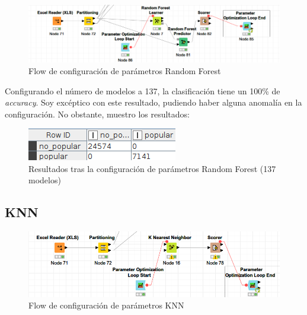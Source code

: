 \begin{figure}[H] %
	\centering
	\includegraphics[scale=0.38]{flow-param-rf.png}  %
	\caption{Flow de configuración de parámetros Random Forest} 
	\label{fig:conf-rf}
\end{figure}

Configurando el número de modelos a 137, la clasificación tiene un 100\% de \textit{accuracy}. Soy excéptico con este resultado, pudiendo haber alguna anomalía en la configuración. No obstante, muestro los resultados:


\begin{figure}[H] %
	\centering
	\includegraphics[scale=0.8]{acc-rf-param.png}  %
	\caption{Resultados tras la configuración de parámetros Random Forest (137 modelos)} 
	\label{fig:acc-param-rf}
\end{figure}


\subsection{KNN}

\begin{figure}[H] %
	\centering
	\includegraphics[scale=0.38]{flow-param-knn.png}  %
	\caption{Flow de configuración de parámetros KNN} 
	\label{fig:conf-knn}
\end{figure}

